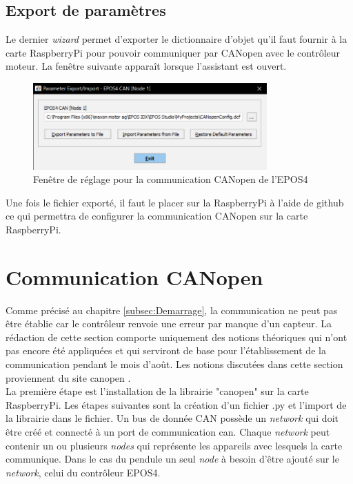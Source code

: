 \subsection{Export de paramètres}
Le dernier \textit{\gls{wizard}} permet d'exporter le dictionnaire d'objet qu'il faut fournir à la carte RaspberryPi pour pouvoir communiquer par
CANopen avec le contrôleur moteur. La fenêtre suivante apparaît lorsque l'assistant est ouvert.

\begin{figure}[H]
    \centering
    \includegraphics[width = 0.8\textwidth]{assets/figures/ParamExport.png}
    \caption{Fenêtre de réglage pour la communication CANopen de l'EPOS4}
    \label{fig:ParamExport}
\end{figure}

Une fois le fichier exporté, il faut le placer sur la RaspberryPi à l'aide de github ce qui permettra de configurer la communication CANopen sur
la carte RaspberryPi.

\section{Communication CANopen}
Comme précisé au chapitre \ref{subsec:Demarrage}, la communication ne peut pas être établie car le contrôleur renvoie une erreur par manque d'un
capteur. La rédaction de cette section comporte uniquement des notions théoriques qui n'ont pas encore été appliquées et qui serviront de base
pour l'établissement de la communication pendant le mois d'août. Les notions discutées dans cette section proviennent du site canopen \cite{canopen}.\\

La première étape est l'installation de la librairie "canopen" sur la carte RaspberryPi. Les étapes suivantes sont la création d'un fichier .py et
l'import de la librairie dans le fichier. Un bus de donnée CAN possède un \textit{network} qui doit être créé et connecté à un port de communication
can. Chaque \textit{network} peut contenir un ou plusieurs \textit{nodes} qui représente les appareils avec lesquels la carte communique. Dans le cas
du pendule un seul \textit{node} à besoin d'être ajouté sur le \textit{network}, celui du contrôleur EPOS4.\\

